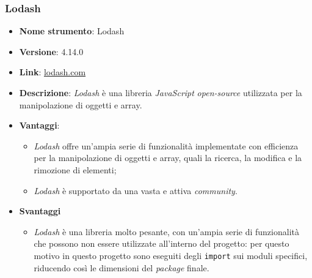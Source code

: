 \subsubsection{Lodash}
\begin{itemize}
      \item \textbf{Nome strumento}: Lodash
      \item \textbf{Versione}: 4.14.0
      \item \textbf{Link}: \href{https://lodash.com/}{lodash.com}
      \item \textbf{Descrizione}: \textit{Lodash} è una libreria \textit{JavaScript} \textit{open-source} utilizzata per la manipolazione di oggetti e array.
      \item \textbf{Vantaggi}:
            \begin{itemize}
                  \item \textit{Lodash} offre un'ampia serie di funzionalità implementate con efficienza per la manipolazione di oggetti e array,
                        quali la ricerca, la modifica e la rimozione di elementi;
                  \item \textit{Lodash} è supportato da una vasta e attiva \textit{community}.
            \end{itemize}
      \item \textbf{Svantaggi}
            \begin{itemize}
                  \item \textit{Lodash} è una libreria molto pesante, con un'ampia serie di funzionalità che possono non essere utilizzate all'interno del progetto:
                        per questo motivo in questo progetto sono eseguiti degli \texttt{import} sui moduli specifici, riducendo così le dimensioni del \textit{\gls{package}\glox} finale.
            \end{itemize}
\end{itemize}

